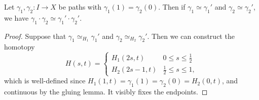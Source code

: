 \begin{lemma} \label{lem:concat-well-defined}
	Let $\gamma_1, \gamma_2: I \rightarrow X$ be paths with $\gamma_1(1) = \gamma_2(0)$. Then if $\gamma_1 \simeq \gamma_1'$ and $\gamma_2 \simeq \gamma_2'$, we have $\gamma_1 \cdot \gamma_2 \simeq \gamma_1' \cdot \gamma_2'$.
\end{lemma}
\begin{proof}
	Suppose that $\gamma_1 \simeq_{H_1} \gamma_1'$ and $\gamma_2 \simeq_{H_2} \gamma_2'$. Then we can construct the homotopy
	$$
	H(s, t)= \begin{cases}H_1(2 s, t) & 0 \leq s \leq \frac{1}{2} \\ H_2(2 s-1, t) & \frac{1}{2} \leq s \leq 1,\end{cases}
	$$
	which is well-defined since $H_1(1,t) = \gamma_1(1) = \gamma_2(0) = H_2(0,t)$, and continuous by the gluing lemma. It visibly fixes the endpoints.
\end{proof}

